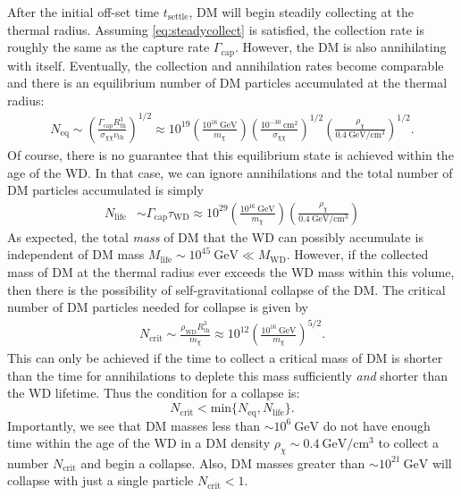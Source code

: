 \documentclass[preprintnumbers,amsmath,amssymb,prd,superscriptaddress]{revtex4}
\newcommand{\GeV}{\text{GeV}}
\newcommand{\cm}{\text{cm}}
\def\r{\right)}
\def\l{\left(}
\begin{document}
After the initial off-set time $t_\text{settle}$, DM will begin steadily collecting at the thermal radius.
Assuming \eqref{eq:steadycollect} is satisfied, the collection rate is roughly the same as the capture rate $\Gamma_\text{cap}$. 
However, the DM is also annihilating with itself.
Eventually, the collection and annihilation rates become comparable and there is an equilibrium number of DM particles accumulated at the thermal radius:
\begin{align}
N_\text{eq} \sim \l \frac{\Gamma_\text{cap} R_\text{th}^3}{\sigma_{\chi \chi} v_\text{th}} \r^{1/2} \approx 10^{19} \l \frac{10^{16} ~\GeV}{m_\chi} \r \l \frac{10^{-30} ~\cm^2}{\sigma_{\chi \chi}} \r^{1/2} \l \frac{\rho_\chi}{0.4 ~\GeV/\cm^3} \r^{1/2}.
\end{align}
Of course, there is no guarantee that this equilibrium state is achieved within the age of the WD. 
In that case, we can ignore annihilations and the total number of DM particles accumulated is simply
\begin{align}
N_\text{life} &\sim \Gamma_\text{cap} \tau_\text{WD} \approx 10^{29}  \l \frac{10^{16} ~\GeV}{m_\chi} \r \l \frac{\rho_\chi}{0.4 ~\GeV/\cm^3} \r
\end{align}
As expected, the total \emph{mass} of DM that the WD can possibly accumulate is independent of DM mass $M_\text{life} \sim 10^{45} ~\GeV \ll M_\text{WD}$. 
However, if the collected mass of DM at the thermal radius ever exceeds the WD mass within this volume, then there is the possibility of self-gravitational collapse of the DM.
The critical number of DM particles needed for collapse is given by
\begin{align}
\label{eq:Ncore}
    N_\text{crit} \sim \frac{\rho_\text{WD} R^3_\text{th}}{m_\chi} \approx 10^{12} \l \frac{10^{16} ~\GeV}{m_\chi} \r^{5/2}. \nonumber
\end{align}
This can only be achieved if the time to collect a critical mass of DM is shorter than the time for annihilations to deplete this mass sufficiently \emph{and} shorter than the WD lifetime. 
Thus the condition for a collapse is:
\begin{equation}
\label{eq:collapsecondition}
N_\text{crit} < \text{min}\{N_\text{eq}, N_\text{life}\}. 
\end{equation}
Importantly, we see that DM masses less than $\sim 10^{6} ~\GeV$ do not have enough time within the age of the WD in a DM density $\rho_\chi \sim 0.4 ~\GeV/\cm^3$ to collect a number $N_\text{crit}$ and begin a collapse. 
Also, DM masses greater than $\sim 10^{21} ~\GeV$ will collapse with just a single particle $N_\text{crit} < 1$.
\end{document}
